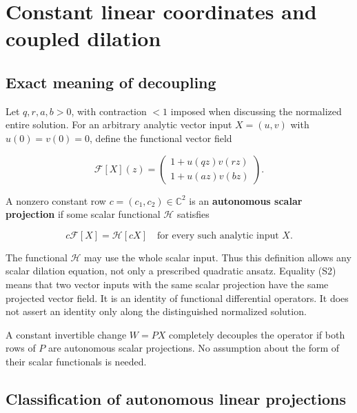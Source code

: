 \hypertarget{v11-coupled_structure_full-constant-linear-coordinates-and-coupled-dilation}{%
\section{Constant linear coordinates and coupled
dilation}\label{v11-coupled_structure_full-constant-linear-coordinates-and-coupled-dilation}}

\hypertarget{v11-coupled_structure_full-exact-meaning-of-decoupling}{%
\subsection{Exact meaning of
decoupling}\label{v11-coupled_structure_full-exact-meaning-of-decoupling}}

Let \(q,r,a,b>0\), with contraction \(<1\) imposed when discussing the
normalized entire solution. For an arbitrary analytic vector input
\(X=(u,v)\) with \(u(0)=v(0)=0\), define the functional vector field

\[
\mathcal F[X](z)=
\begin{pmatrix}1+u(qz)v(rz)\\1+u(az)v(bz)\end{pmatrix}.
\tag{S1}
\]

A nonzero constant row \(c=(c_1,c_2)\in\mathbb C^2\) is an
\textbf{autonomous scalar projection} if some scalar functional
\(\mathcal H\) satisfies

\[
c\mathcal F[X]=\mathcal H[cX]
\quad\text{for every such analytic input }X.
\tag{S2}
\]

The functional \(\mathcal H\) may use the whole scalar input. Thus this
definition allows any scalar dilation equation, not only a prescribed
quadratic ansatz. Equality (S2) means that two vector inputs with the
same scalar projection have the same projected vector field. It is an
identity of functional differential operators. It does not assert an
identity only along the distinguished normalized solution.

A constant invertible change \(W=PX\) completely decouples the operator
if both rows of \(P\) are autonomous scalar projections. No assumption
about the form of their scalar functionals is needed.

\hypertarget{v11-coupled_structure_full-classification-of-autonomous-linear-projections}{%
\subsection{Classification of autonomous linear
projections}\label{v11-coupled_structure_full-classification-of-autonomous-linear-projections}}

